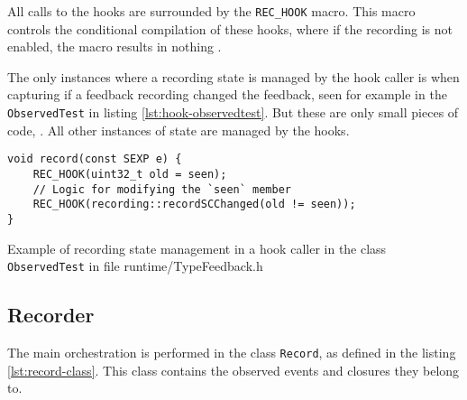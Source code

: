 All calls to the hooks are surrounded by the \texttt{REC\_HOOK} macro. This macro controls the conditional compilation of these hooks, where if the recording is not enabled, the macro results in nothing .

The only instances where a recording state is managed by the hook caller is when capturing if a feedback recording changed the feedback, seen for example in the \texttt{ObservedTest} in listing \ref{lst:hook-observedtest}. But these are only small pieces of code, \todoadd. All other instances of state are managed by the hooks.

\begin{listing}
	\centering
	\begin{verbatim}
void record(const SEXP e) {
    REC_HOOK(uint32_t old = seen);
    // Logic for modifying the `seen` member
    REC_HOOK(recording::recordSCChanged(old != seen));
}
  \end{verbatim}
	\caption{Example of recording state management in a hook caller in the class \texttt{ObservedTest} in file runtime/TypeFeedback.h}\label{lst:hook-observedtest}
\end{listing}

\subsection{Recorder}

The main orchestration is performed in the class \texttt{Record}, as defined in the listing \ref{lst:record-class}. This class contains the observed events and closures they belong to.

